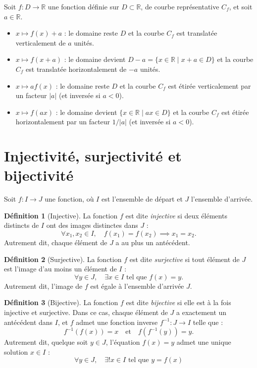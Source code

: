 \documentclass{report} %
\theoremstyle{definition}  %
\newtheorem{definition}{Définition}[chapter] %
\theoremstyle{plain} %
\theoremstyle{remark} %
\begin{document}
Soit \(f : D \to \mathbb{R}\) une fonction définie sur \(D\subset \mathbb{R}\), de courbe représentative \(C_f\), et soit \(a \in \mathbb{R}\).

\begin{itemize}
    \item \(x \mapsto f(x) + a\) : le domaine reste \(D\) et la courbe \(C_f\) est translatée verticalement de \(a\) unités.
    
    \item \(x \mapsto f(x + a)\) : le domaine devient \(D - a = \{x \in \mathbb{R} \mid x + a \in D\}\) et la courbe \(C_f\) est translatée horizontalement de \(-a\) unités.
    
    \item \(x \mapsto a f(x)\) : le domaine reste \(D\) et la courbe \(C_f\) est étirée verticalement par un facteur \(|a|\) (et inversée si \(a < 0\)).
    
    \item \(x \mapsto f(ax)\) : le domaine devient \(\{x \in \mathbb{R} \mid ax \in D\}\) et la courbe \(C_f\) est étirée horizontalement par un facteur \(1/|a|\) (et inversée si \(a < 0\)).
\end{itemize}


\section{\textbf{Injectivité, surjectivité et bijectivité}}

Soit \(f : I \to J\) une fonction, où \(I\) est l’ensemble de départ et \(J\) l’ensemble d’arrivée.

\begin{definition}[Injective]
La fonction \(f\) est dite \emph{injective} si deux éléments distincts de \(I\) ont des images distinctes dans \(J\) :
\[
\forall x_1, x_2 \in I, \quad f(x_1) = f(x_2) \implies x_1 = x_2.
\]
Autrement dit, chaque élément de \(J\) a au plus un antécédent.
\end{definition}

\begin{definition}[Surjective]
La fonction \(f\) est dite \emph{surjective} si tout élément de \(J\) est l’image d’au moins un élément de \(I\) :
\[
\forall y \in J, \quad \exists x \in I \text{ tel que } f(x) = y.
\]
Autrement dit, l’image de \(f\) est égale à l’ensemble d’arrivée \(J\).
\end{definition}

\begin{definition}[Bijective]
La fonction \(f\) est dite \emph{bijective} si elle est à la fois injective et surjective.  
Dans ce cas, chaque élément de \(J\) a exactement un antécédent dans \(I\), et \(f\) admet une fonction inverse \(f^{-1} : J \to I\) telle que :
\[
f^{-1}(f(x)) = x \quad \text{et} \quad f(f^{-1}(y)) = y.
\]
Autrement dit, quelque soit \(y \in J\), l'équation \(f(x) = y\) admet une unique solution \(x \in I\) :
\[\forall y \in J,  \quad \exists !  x \in I \text{ tel que } y = f(x)\]
\end{definition}
\end{document}
